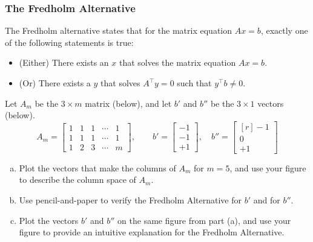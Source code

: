 \documentclass[11pt,oneside]{article}
\theoremstyle{definition}
\theoremstyle{definition}
\theoremstyle{remark}
\numberwithin{equation}{section}
\begin{document}
\subsubsection*{The Fredholm Alternative}
The Fredholm alternative states that for the matrix equation $Ax=b$, exactly one of the following statements is true:
\begin{itemize}
    \item (Either) There exists an $x$ that solves the matrix equation $Ax=b$.
    \item (Or) There exists a $y$ that solves $A^\top y = 0$ such that $y^\top b \neq 0$.
\end{itemize}
Let $A_m$ be the $3 \times m$ matrix (below), and let $b'$ and $b''$ be the $3 \times 1$ vectors (below).
\begin{equation*}
A_m = \begin{bmatrix} 1 & 1 & 1 & \cdots & 1\\ 1 & 1 & 1 & \cdots & 1 \\ 1 & 2 & 3 &  \cdots & m \end{bmatrix}, \quad  \quad b' = \begin{bmatrix} -1 \\ -1 \\ +1 \end{bmatrix}, \quad b'' = \begin{bmatrix*}[r] -1 \\ 0 \\ +1 \end{bmatrix*}
\end{equation*}

\begin{enumerate}[(a)]
    \item Plot the vectors that make the columns of $A_m$ for $m = 5$, and use your figure to describe the column space of $A_m$.
    \item Use pencil-and-paper to verify the Fredholm Alternative for $b'$ and for $b''$.
    \item Plot the vectors $b'$ and $b''$ on the same figure from part (a), and use your figure to provide an intuitive explanation for the Fredholm Alternative.
\end{enumerate}
\end{document}
